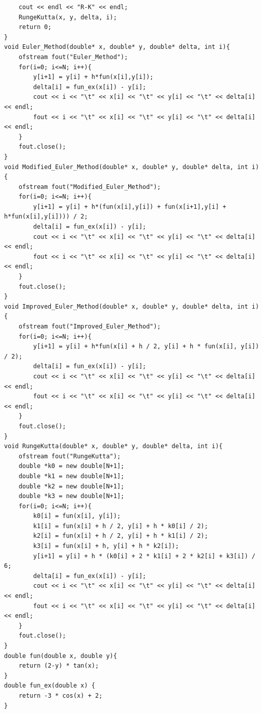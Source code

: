 \documentclass[
11pt,
master, %
subf, %
href, %
colorlinks=true, %
times, %
]{disser}
\begin{document}
{\begin{verbatim}
    cout << endl << "R-K" << endl;
    RungeKutta(x, y, delta, i);
    return 0;
}
void Euler_Method(double* x, double* y, double* delta, int i){
    ofstream fout("Euler_Method");
    for(i=0; i<=N; i++){
        y[i+1] = y[i] + h*fun(x[i],y[i]);
        delta[i] = fun_ex(x[i]) - y[i];
        cout << i << "\t" << x[i] << "\t" << y[i] << "\t" << delta[i] << endl;
        fout << i << "\t" << x[i] << "\t" << y[i] << "\t" << delta[i] << endl;
    }
    fout.close();
}
void Modified_Euler_Method(double* x, double* y, double* delta, int i){
    ofstream fout("Modified_Euler_Method");
    for(i=0; i<=N; i++){
        y[i+1] = y[i] + h*(fun(x[i],y[i]) + fun(x[i+1],y[i] + h*fun(x[i],y[i]))) / 2;
        delta[i] = fun_ex(x[i]) - y[i];
        cout << i << "\t" << x[i] << "\t" << y[i] << "\t" << delta[i] << endl;
        fout << i << "\t" << x[i] << "\t" << y[i] << "\t" << delta[i] << endl;
    }
    fout.close();
}
void Improved_Euler_Method(double* x, double* y, double* delta, int i){
    ofstream fout("Improved_Euler_Method");
    for(i=0; i<=N; i++){
        y[i+1] = y[i] + h*fun(x[i] + h / 2, y[i] + h * fun(x[i], y[i]) / 2);
        delta[i] = fun_ex(x[i]) - y[i];
        cout << i << "\t" << x[i] << "\t" << y[i] << "\t" << delta[i] << endl;
        fout << i << "\t" << x[i] << "\t" << y[i] << "\t" << delta[i] << endl;
    }
    fout.close();
}
void RungeKutta(double* x, double* y, double* delta, int i){
    ofstream fout("RungeKutta");
    double *k0 = new double[N+1];
    double *k1 = new double[N+1];
    double *k2 = new double[N+1];
    double *k3 = new double[N+1];
    for(i=0; i<=N; i++){
        k0[i] = fun(x[i], y[i]);
        k1[i] = fun(x[i] + h / 2, y[i] + h * k0[i] / 2);
        k2[i] = fun(x[i] + h / 2, y[i] + h * k1[i] / 2);
        k3[i] = fun(x[i] + h, y[i] + h * k2[i]);
        y[i+1] = y[i] + h * (k0[i] + 2 * k1[i] + 2 * k2[i] + k3[i]) / 6;
        delta[i] = fun_ex(x[i]) - y[i];
        cout << i << "\t" << x[i] << "\t" << y[i] << "\t" << delta[i] << endl;
        fout << i << "\t" << x[i] << "\t" << y[i] << "\t" << delta[i] << endl;
    }
    fout.close();
}
double fun(double x, double y){
    return (2-y) * tan(x);
}
double fun_ex(double x) {
    return -3 * cos(x) + 2;
}
\end{verbatim}
}
\end{document}
